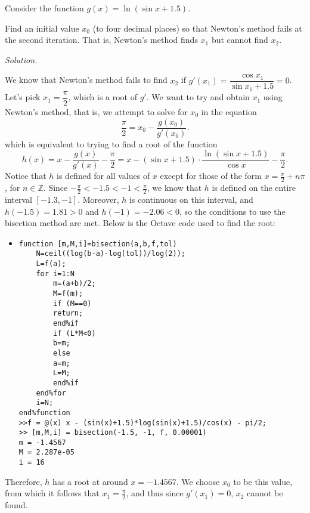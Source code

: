 \documentclass{eh-homework}
\begin{document}
    \begin{question}{3}
    Consider the function \(g(x) = \ln(\sin x + 1.5)\).
    
    Find an initial value \(x_0\) (to four decimal places) so that Newton’s method fails at the second iteration. That is, Newton’s method finds \(x_1\) but cannot find \(x_2\).

    \textit{Solution.}
    
    We know that Newton's method fails to find \(x_2\) if \(g'(x_1) = \dfrac{\cos x_1}{\sin x_1 + 1.5} = 0\). Let's pick \(x_1 = \dfrac{\pi}{2}\), which is a root of \(g'\). We want to try and obtain \(x_1\) using Newton's method, that is, we attempt to solve for \(x_0\) in the equation
    \[
        \frac{\pi}{2} = x_0 - \frac{g(x_0)}{g'(x_0)}.
    \]
    which is equivalent to trying to find a root of the function
    \[
        h(x) = x - \dfrac{g(x)}{g'(x)} - \dfrac{\pi}{2} = x - (\sin x + 1.5) \cdot \frac{\ln (\sin x + 1.5)}{\cos x} - \frac{\pi}{2}.
    \]
    Notice that \(h\) is defined for all values of \(x\) except for those of the form \(x = \frac{\pi}{2} + n \pi\), for \(n \in \mathbb{Z}\). Since \(-\frac{\pi}{2} < -1.5 < -1 < \frac{\pi}{2}\), we know that \(h\) is defined on the entire interval \([-1.3, -1]\). Moreover, \(h\) is continuous on this interval, and \(h(-1.5) = 1.81 > 0\) and \(h(-1) = -2.06 < 0\), so the conditions to use the bisection method are met. Below is the Octave code used to find the root:

    \begin{itemize}
        \item[]
        \begin{lstlisting}
function [m,M,i]=bisection(a,b,f,tol)
    N=ceil((log(b-a)-log(tol))/log(2));
    L=f(a);
    for i=1:N
        m=(a+b)/2;
        M=f(m);
        if (M==0)
        return;
        end%if
        if (L*M<0)
        b=m;
        else
        a=m;
        L=M;
        end%if
    end%for
    i=N;
end%function
>>f = @(x) x - (sin(x)+1.5)*log(sin(x)+1.5)/cos(x) - pi/2;
>> [m,M,i] = bisection(-1.5, -1, f, 0.00001)
m = -1.4567
M = 2.287e-05
i = 16
        \end{lstlisting}
    \end{itemize}
    Therefore, \(h\) has a root at around \(x = -1.4567\). We choose \(x_0\) to be this value, from which it follows that \(x_1 = \frac{\pi}{2}\), and thus since \(g'(x_1) = 0\), \(x_2\) cannot be found.
    \end{question}
    \newpage
\end{document}
